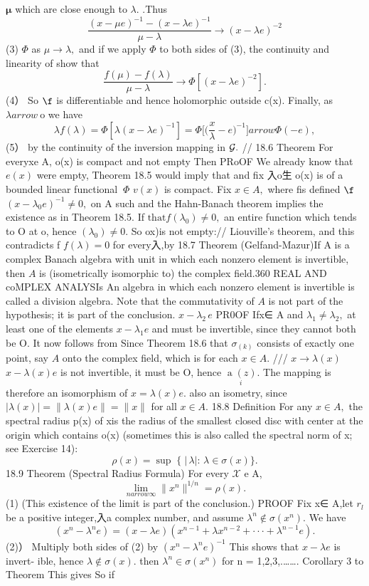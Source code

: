 ${\boldsymbol{\mu}}$ which are close enough to $\lambda.$ .Thus $$ {\frac{(x-\mu e)^{-1}-(x-\lambda e)^{-1}}{\mu-\lambda}}\to(x-\lambda e)^{-2} $$ (3) $\Phi$ as $\mu\to\lambda,$ and if we apply $\Phi$ to both sides of (3), the continuity and linearity of show that $$ {\frac{f(\mu)-f(\lambda)}{\mu-\lambda}}\to\Phi[(x-\lambda e)^{-2}]. $$ (4） So $\boldsymbol{\f}$ is differentiable and hence holomorphic outside c(x). Finally, as $\lambda{ arrow}~\mathrm{o}$ we have $$ \lambda f(\lambda)=\Phi[\lambda(x-\lambda e)^{-1}]=\Phi\bigg[\bigg(\frac{x}{\lambda}-e\bigg)^{-1}\bigg] arrow\Phi(-e), $$ (5） by the continuity of the inversion mapping in ${\cal G}.$ // 18.6 Theorem For everyxe A, o(x) is compact and not empty Then PRoOF We already know that $\scriptstyle{e(x)}$ were empty, Theorem 18.5 would imply that and fix 入o生 o(x) is of a bounded linear functional $\ \Phi$ $\scriptstyle{v(x)}$ is compact. Fix $x\in A,$ where fis defined $\boldsymbol{\f}$ $(x-\lambda_{0}e)^{-1}\neq0,$ on A such and the Hahn-Banach theorem implies the existence as in Theorem 18.5. If $\mathrm{that}f(\lambda_{0})\neq0,$ an entire function which tends to O at o, hence $(\lambda_{0})\neq0.$ So ox)is not empty:// Liouville's theorem, and this contradicts f $f(\lambda)=0$ for every入,by 18.7 Theorem (Gelfand-Mazur)If A is a complex Banach algebra with unit in which each nonzero element is invertible, then $\scriptstyle A$ is (isometrically isomorphic to) the complex field.360 REAL AND coMPLEX ANALYSIs An algebra in which each nonzero element is invertible is called a division algebra. Note that the commutativity of $\scriptstyle A$ is not part of the hypothesis; it is part of the conclusion. $x-\lambda_{2}\,e$ PR0OF Ifx∈ A and $\lambda_{1}\neq\lambda_{2},$ at least one of the elements $x-\lambda_{1}e$ and must be invertible, since they cannot both be O. It now follows from Since Theorem 18.6 that $\scriptstyle{\sigma_{(k)}}$ consists of exactly one point, say $\scriptstyle A$ onto the complex field, which is for each $x\in A.$ /// $x\to\lambda(x)$ $x-\lambda(x)e$ is not invertible, it must be O, hence ${\underset{i}{\operatorname{a}(z)}}.$ The mapping is therefore an isomorphism of $x=\lambda(x)e.$ also an isometry, since $|\lambda(x)|=\|\lambda(x)e\|=\|x\|$ for all $x\in A.$ 18.8 Definition For any $x\in A,$ the spectral radius p(x) of xis the radius of the smallest closed disc with center at the origin which contains o(x) (sometimes this is also called the spectral norm of x; see Exercise 14): $$ \rho(x)=\operatorname*{sup}\;\{\;|\,\lambda|\!:\,\lambda\in\sigma(x)\}. $$ 18.9 Theorem (Spectral Radius Formula) For every $\scriptstyle{\mathcal{X}}$ e A, $$ \operatorname*{lim}_{n arrow\infty}\|x^{n}\|^{1/n}=\rho(x). $$ (1) (This existence of the limit is part of the conclusion.) PROOF Fix x∈ A,let $r_{\mathit{l}}$ be a positive integer,入a complex number, and assume $\lambda^{n}\notin\sigma(x^{n}).$ We have $$ (x^{n}-\lambda^{n}e)=(x-\lambda e)(x^{n-1}+\lambda x^{n-2}+\cdot\cdot\cdot+\lambda^{n-1}e). $$ (2)） Multiply both sides of (2) by $(x^{n}-\lambda^{n}e)^{-1}$ This shows that $x-\lambda e$ is invert- ible, hence $\lambda\notin\sigma(x).$ then $\lambda^{n}\in\sigma(x^{n})$ for n = 1,2,3,.……. Corollary 3 to Theorem This gives So if 